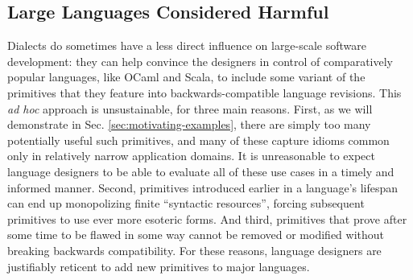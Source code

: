 \subsection{Large Languages Considered Harmful}
Dialects do sometimes have a less direct influence on large-scale software development: they can help convince the designers in control of comparatively popular languages, like OCaml and Scala, to include some variant of the primitives that they feature into backwards-compatible language revisions. %
This \emph{ad hoc} approach is unsustainable, for three main reasons. First, as we will demonstrate in Sec. \ref{sec:motivating-examples}, there are simply too  many potentially useful such primitives, and many of these capture idioms common only in relatively narrow application domains. It is unreasonable to expect language designers to be able to evaluate all of these use cases in a timely and informed manner. Second, primitives introduced earlier in a language's lifespan can end up monopolizing finite ``syntactic resources'', forcing subsequent primitives to use ever more esoteric forms. And third, primitives that prove after some time to be flawed in some way cannot be removed or modified without breaking backwards compatibility. For these reasons, language designers are justifiably reticent to add new primitives to major languages.%

